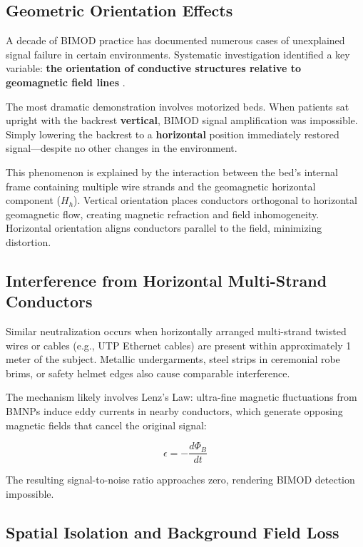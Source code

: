 \documentclass[12pt,a4paper]{article}
\begin{document}
\subsection{Geometric Orientation Effects}

A decade of BIMOD practice has documented numerous cases of unexplained signal failure in certain environments. Systematic investigation identified a key variable: \textbf{the orientation of conductive structures relative to geomagnetic field lines} \cite{yoon2026_401}.

The most dramatic demonstration involves motorized beds. When patients sat upright with the backrest \textbf{vertical}, BIMOD signal amplification was impossible. Simply lowering the backrest to a \textbf{horizontal} position immediately restored signal—despite no other changes in the environment.

This phenomenon is explained by the interaction between the bed's internal frame containing multiple wire strands and the geomagnetic horizontal component (\(H_h\)). Vertical orientation places conductors orthogonal to horizontal geomagnetic flow, creating magnetic refraction and field inhomogeneity. Horizontal orientation aligns conductors parallel to the field, minimizing distortion.

\subsection{Interference from Horizontal Multi-Strand Conductors}

Similar neutralization occurs when horizontally arranged multi-strand twisted wires or cables (e.g., UTP Ethernet cables) are present within approximately 1 meter of the subject. Metallic undergarments, steel strips in ceremonial robe brims, or safety helmet edges also cause comparable interference.

The mechanism likely involves Lenz's Law: ultra-fine magnetic fluctuations from BMNPs induce eddy currents in nearby conductors, which generate opposing magnetic fields that cancel the original signal:

\[
\epsilon = -\frac{d\Phi_B}{dt}
\]

The resulting signal-to-noise ratio approaches zero, rendering BIMOD detection impossible.

\subsection{Spatial Isolation and Background Field Loss}
\end{document}
